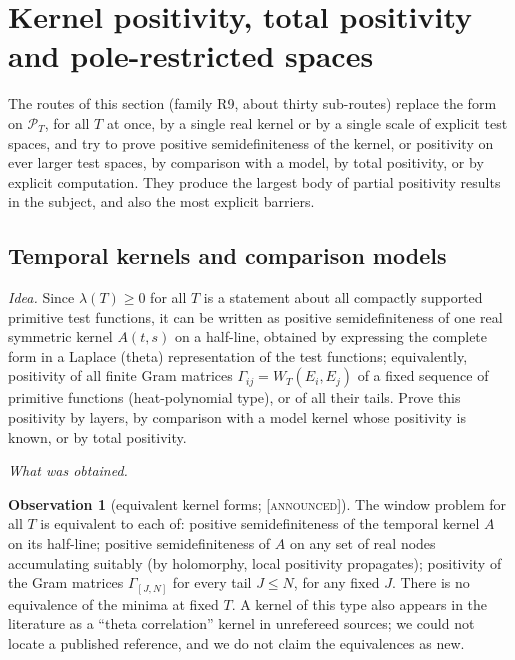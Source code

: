 \documentclass[11pt]{amsart}
\theoremstyle{definition}
\newtheorem{observation}[theorem]{Observation}
\theoremstyle{remark}
\numberwithin{equation}{section}
\newcommand{\PT}{\mathcal{P}_T}                        %
\newcommand{\WT}{W_T}                                  %
\newcommand{\lam}{\lambda(T)}                          %
\newcommand{\stag}[1]{\textsc{[#1]}}
\newcommand{\ANNOUNCED}{\stag{announced}}
\newcommand{\entry}[1]{\par\smallskip\noindent\textit{#1.}\enspace}
\begin{document}
\section{Kernel positivity, total positivity and pole-restricted spaces}\label{w5:sec:kernels}

The routes of this section (family R9, about thirty sub-routes) replace the form on $\PT$, for all $T$ at once, by a single
real kernel or by a single scale of explicit test spaces, and try to prove positive semidefiniteness of the kernel, or
positivity on ever larger test spaces, by comparison with a model, by total positivity, or by explicit computation. They
produce the largest body of partial positivity results in the subject, and also the most explicit barriers.

\subsection{Temporal kernels and comparison models}\label{w5:fam:R9}

\entry{Idea} Since $\lam\ge0$ for all $T$ is a statement about all compactly supported primitive test functions, it can be
written as positive semidefiniteness of one real symmetric kernel $A(t,s)$ on a half-line, obtained by expressing the
complete form in a Laplace (theta) representation of the test functions; equivalently, positivity of all finite Gram
matrices $\Gamma_{ij}=\WT(E_i,E_j)$ of a fixed sequence of primitive functions (heat-polynomial type), or of all their
tails. Prove this positivity by layers, by comparison with a model kernel whose positivity is known, or by total positivity.

\entry{What was obtained}

\begin{observation}[equivalent kernel forms; \ANNOUNCED]\label{w5:obs:kernelequiv}
The window problem for all $T$ is equivalent to each of: positive semidefiniteness of the temporal kernel $A$ on its
half-line; positive semidefiniteness of $A$ on any set of real nodes accumulating suitably (by holomorphy, local
positivity propagates); positivity of the Gram matrices $\Gamma_{[J,N]}$ for every tail $J\le N$, for any fixed $J$. There
is no equivalence of the minima at fixed $T$. A kernel of this type also appears in the literature as a ``theta
correlation'' kernel in unrefereed sources; we could not locate a published reference, and we do not claim the
equivalences as new.
\end{observation}
\end{document}
